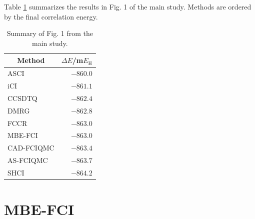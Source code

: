 \documentclass[journal=jcp,manuscript=suppinfo]{achemso}
\begin{document}
Table \ref{results_SI_table} summarizes the results in Fig. 1 of the main study. Methods are ordered by the final correlation energy.
%
\begin{table}[ht]
\begin{center}
\caption{Summary of Fig. 1 from the main study.}
\label{results_SI_table}
\begin{tabular}{l|r}
\toprule
\multicolumn{1}{c|}{Method} & \multicolumn{1}{c}{$\Delta E$/m$E_{\text{H}}$} \\
\midrule\midrule
ASCI & $-860.0$ \\
iCI & $-861.1$ \\
CCSDTQ & $-862.4$ \\
DMRG & $-862.8$ \\
FCCR & $-863.0$ \\
MBE-FCI & $-863.0$ \\
CAD-FCIQMC & $-863.4$ \\
AS-FCIQMC & $-863.7$ \\
SHCI & $-864.2$ \\
\midrule
\end{tabular}
\vspace{-1.4cm}
\end{center}
\end{table}
%

\section{MBE-FCI}
\end{document}
